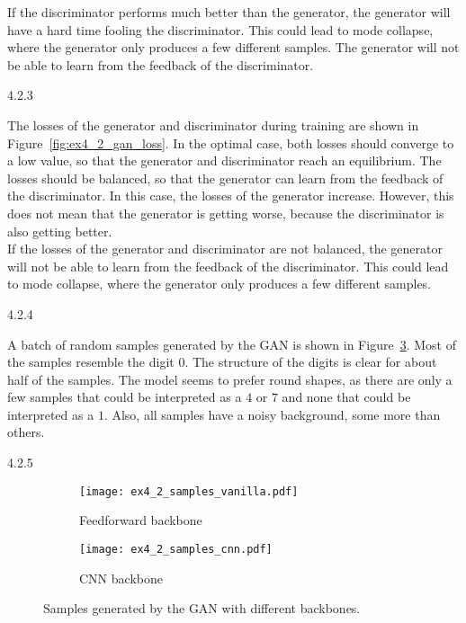 If the discriminator performs much better than the generator, the generator will have a hard time
fooling the discriminator. This could lead to mode collapse, where the generator only produces a few
different samples. The generator will not be able to learn from the feedback of the discriminator.


\begin{task}{4.2.3}
\end{task}

The losses of the generator and discriminator during training are shown in
Figure~\ref{fig:ex4_2_gan_loss}. In the optimal case, both losses should converge to a low value, so
that the generator and discriminator reach an equilibrium. The losses should be balanced, so that
the generator can learn from the feedback of the discriminator. In this case, the losses of the
generator increase. However, this does not mean that the generator is getting worse, because the
discriminator is also getting better.\\
If the losses of the generator and discriminator are not balanced, the generator will not be able to
learn from the feedback of the discriminator. This could lead to mode collapse, where the generator
only produces a few different samples.


\begin{task}{4.2.4}
\end{task}

A batch of random samples generated by the GAN is shown in Figure~\ref{fig:ex4_2_samples}. Most of
the samples resemble the digit $0$. The structure of the digits is clear for about half of the
samples. The model seems to prefer round shapes, as there are only a few samples that could be
interpreted as a $4$ or $7$ and none that could be interpreted as a $1$. Also, all samples have
a noisy background, some more than others.


\begin{task}{4.2.5}
\end{task}

\begin{figure}[ht]
  \centering
  \begin{subfigure}{0.49\textwidth}
    \texttt{[image: ex4\_2\_samples\_vanilla.pdf]}
    \caption{Feedforward backbone}
    \label{fig:ex4_2_samples_vanilla}
  \end{subfigure}
  \begin{subfigure}{0.49\textwidth}
    \texttt{[image: ex4\_2\_samples\_cnn.pdf]}
    \caption{CNN backbone}
    \label{fig:ex4_2_samples_cnn}
  \end{subfigure}
  \caption{Samples generated by the GAN with different backbones.}
  \label{fig:ex4_2_samples}
\end{figure}

